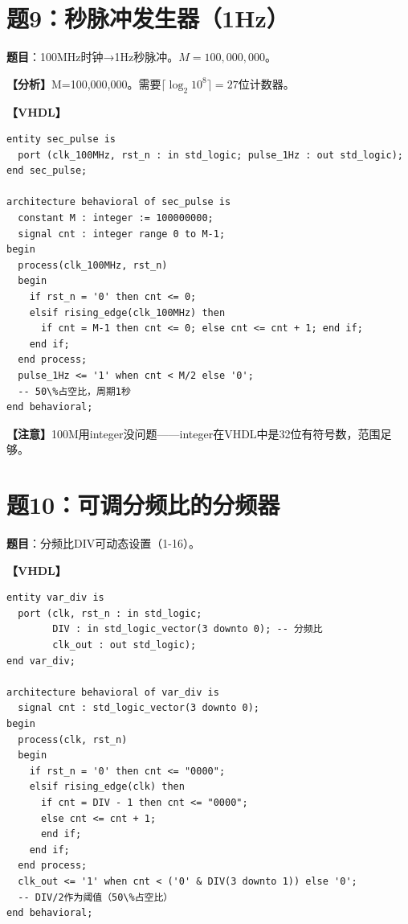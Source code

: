 \section{题9：秒脉冲发生器（1Hz）}

\textbf{题目}：100MHz时钟→1Hz秒脉冲。$M=100{,}000{,}000$。

\begin{solution}[完整解答]

\textbf{【分析】}M=100,000,000。需要$\lceil\log_2 10^8\rceil = 27$位计数器。

\textbf{【VHDL】}
\begin{lstlisting}
entity sec_pulse is
  port (clk_100MHz, rst_n : in std_logic; pulse_1Hz : out std_logic);
end sec_pulse;

architecture behavioral of sec_pulse is
  constant M : integer := 100000000;
  signal cnt : integer range 0 to M-1;
begin
  process(clk_100MHz, rst_n)
  begin
    if rst_n = '0' then cnt <= 0;
    elsif rising_edge(clk_100MHz) then
      if cnt = M-1 then cnt <= 0; else cnt <= cnt + 1; end if;
    end if;
  end process;
  pulse_1Hz <= '1' when cnt < M/2 else '0';
  -- 50\%占空比，周期1秒
end behavioral;
\end{lstlisting}

\textbf{【注意】}100M用integer没问题——integer在VHDL中是32位有符号数，范围足够。

\end{solution}


\section{题10：可调分频比的分频器}

\textbf{题目}：分频比DIV可动态设置（1-16）。

\begin{solution}[完整解答]

\textbf{【VHDL】}
\begin{lstlisting}
entity var_div is
  port (clk, rst_n : in std_logic;
        DIV : in std_logic_vector(3 downto 0); -- 分频比
        clk_out : out std_logic);
end var_div;

architecture behavioral of var_div is
  signal cnt : std_logic_vector(3 downto 0);
begin
  process(clk, rst_n)
  begin
    if rst_n = '0' then cnt <= "0000";
    elsif rising_edge(clk) then
      if cnt = DIV - 1 then cnt <= "0000";
      else cnt <= cnt + 1;
      end if;
    end if;
  end process;
  clk_out <= '1' when cnt < ('0' & DIV(3 downto 1)) else '0';
  -- DIV/2作为阈值（50\%占空比）
end behavioral;
\end{lstlisting}

\end{solution}


